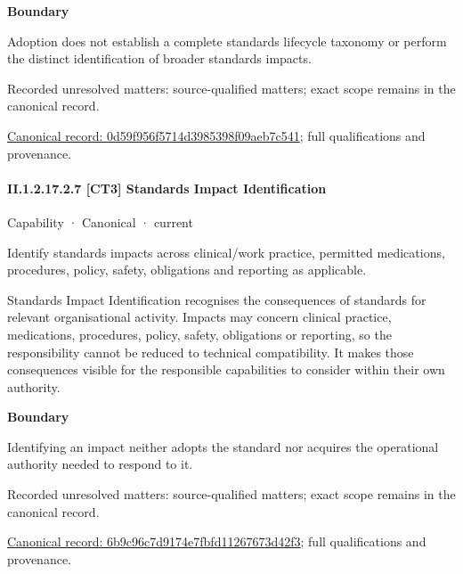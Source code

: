 \textbf{Boundary}



Adoption does not establish a complete standards lifecycle taxonomy or perform the distinct identification of broader standards impacts.


{\small Recorded unresolved matters: source-qualified matters; exact scope remains in the canonical record.}\par
{\footnotesize \href{../../../../continuum/strategy/capability/0d59f956f5714d3985398f09aeb7c541.md}{Canonical record: 0d59f956f5714d3985398f09aeb7c541}; full qualifications and provenance.}\par
\paragraph*{II.1.2.17.2.7 [CT3] Standards Impact Identification}
\label{navigation:II.1.2.17.2.7}

\label{element:6b9c96c7d9174e7fbfd11267673d42f3}
{\small Capability · Canonical · current}\par

Identify standards impacts across clinical/work practice, permitted medications, procedures, policy, safety, obligations and reporting as applicable.



Standards Impact Identification recognises the consequences of standards for relevant organisational activity. Impacts may concern clinical practice, medications, procedures, policy, safety, obligations or reporting, so the responsibility cannot be reduced to technical compatibility. It makes those consequences visible for the responsible capabilities to consider within their own authority.



\textbf{Boundary}



Identifying an impact neither adopts the standard nor acquires the operational authority needed to respond to it.


{\small Recorded unresolved matters: source-qualified matters; exact scope remains in the canonical record.}\par
{\footnotesize \href{../../../../continuum/strategy/capability/6b9c96c7d9174e7fbfd11267673d42f3.md}{Canonical record: 6b9c96c7d9174e7fbfd11267673d42f3}; full qualifications and provenance.}\par
